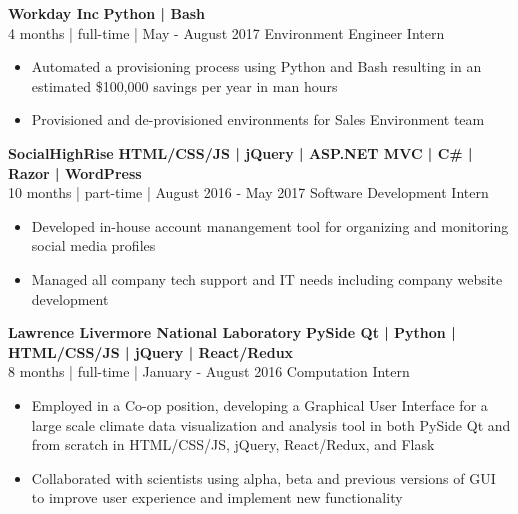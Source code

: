 \documentclass[12pt]{article}
\begin{document}
    \begin{footnotesize}
    \flushleft
    \textbf{\color{primary}\large Workday Inc} \hfill \textbf{\color{Cerulean}Python | Bash}\\ 
    {\color{primary}4 months | full-time | May - August 2017} \hfill {\color{Cerulean} Environment Engineer Intern}
    \vspace{-2mm}
    \begin{itemize}
        \setlength{\itemsep}{0pt}
        \item Automated a provisioning process using Python and Bash resulting in an estimated \$100,000 savings per year in man hours
        \item Provisioned and de-provisioned environments for Sales Environment team
    \end{itemize}
    \textbf{\color{primary}\large SocialHighRise} \hfill  \textbf{\color{Cerulean}HTML/CSS/JS | jQuery | ASP.NET MVC | C\# | Razor | WordPress } \\ 
    {\color{primary}10 months | part-time | August 2016 - May 2017} \hfill {\color{Cerulean} Software Development Intern}
    \vspace{-2mm}
    \begin{itemize}
        \setlength{\itemsep}{0pt}
        \item Developed in-house account manangement tool for organizing and monitoring social media profiles
        \item Managed all company tech support and IT needs including company website development
    \end{itemize}
    \textbf{\color{primary}\large Lawrence Livermore National Laboratory} \hfill \textbf{\color{Cerulean}PySide Qt | Python | HTML/CSS/JS | jQuery | React/Redux}\\
    {\color{primary}8 months | full-time | January - August 2016} \hfill {\color{Cerulean} Computation Intern}
    \vspace{-2mm}
    \begin{itemize}
        \setlength{\itemsep}{0pt}
        \item Employed in a Co-op position, developing a Graphical User Interface for a large scale climate data visualization and analysis tool in both PySide Qt and from scratch in HTML/CSS/JS, jQuery, React/Redux, and Flask

        \item Collaborated with scientists using alpha, beta and previous versions of GUI to improve user experience and implement new functionality
    \end{itemize}

    \end{footnotesize}
    
\end{document}
